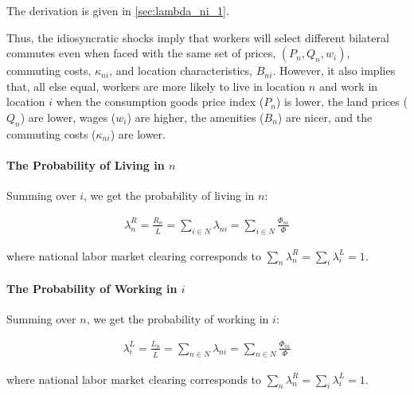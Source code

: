 \documentclass[10pt]{article}
\begin{document}
The derivation is given in \autoref{sec:lambda_ni_1}.

Thus, the idiosyncratic shocks imply that 
workers will select different bilateral commutes even 
when faced with the same set of prices, $(P_n, Q_n, w_i)$,
commuting costs, $\kappa_{n i}$, and location characteristics, $B_{n i}$.
However, it also implies that, all else equal, 
workers are more likely to live in location $n$
and work in location $i$ when 
the consumption goods price index ($P_n$) is lower,
the land prices ($Q_n$) are lower, wages ($w_i$) are higher,
the amenities ($B_n$) are nicer, and the commuting 
costs ($\kappa_{n i}$) are lower.

\paragraph{The Probability of Living in $n$}

Summing over $i$, we get the probability of living in $n$:

\begin{align}
    \lambda_n^R=\frac{R_n}{\bar{L}}=\sum_{i \in N} \lambda_{n i}=\sum_{i \in N} \frac{\Phi_{n i}}{\Phi} \label{eq:lambda_n_R}
\end{align}

where national labor market clearing 
corresponds to $\sum_n \lambda_n^R=\sum_i \lambda_i^L=1$.


\paragraph{The Probability of Working in $i$}

Summing over $n$, we get the probability of working in $i$:

\begin{align}
    \lambda_i^L=\frac{L_n}{\bar{L}}=\sum_{n \in N} \lambda_{n i}=\sum_{n \in N} \frac{\Phi_{n i}}{\Phi} \label{eq:lambda_i_L}
\end{align}

where national labor market clearing 
corresponds to $\sum_n \lambda_n^R=\sum_i \lambda_i^L=1$.

\end{document}
